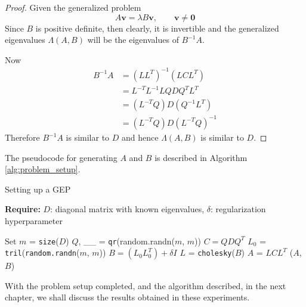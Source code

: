 \begin{proof}
	Given the generalized problem
	\begin{equation}
		A \mathbf{v} = \lambda B \mathbf{v}, \qquad \mathbf{v} \neq \mathbf{0}
	\end{equation}
	Since $B$ is positive definite, then clearly, it is invertible and the generalized eigenvalues $\Lambda(A, B)$ will be the eigenvalues of $B^{-1}A$.

	Now
	\begin{align*}
		B^{-1}A & = (LL^T)^{-1}(LCL^T)\\
		& = L^{-T}L^{-1}LQDQ^{T}L^T\\
		& = (L^{-T}Q)D(Q^{-1}L^{T}) \\
		& = (L^{-T}Q)D(L^{-T}Q)^{-1}
	\end{align*}
	Therefore $B^{-1}A$ is similar to $D$ and hence $\Lambda(A,B)$ is similar to $D$.
\end{proof}
The pseudocode for generating $A$ and $B$ is described in Algorithm \ref{alg:problem_setup}.
\begin{algorithm}
	\caption{Setting up a GEP}
	\label{alg:problem_setup}
	
	\textbf{Require:} \( D \): diagonal matrix with known eigenvalues, \(\delta\): regularization hyperparameter
	\begin{algorithmic}[1]
		\State Set $m$ = \texttt{size}($D$)
		\State $Q$, \_\_ = \texttt{qr}(random.randn($m$, $m$))
		\State $C = QDQ^T$
		\State $L_{0}$ = \texttt{tril}(\texttt{random.randn}($m$, $m$))
		\State $B = (L_0 L_0^T) + \delta I$
		\State $L$ = \texttt{cholesky}($B$)
		\State $A$ = $LCL^T$
		\State \Return ($A$, $B$)
		\EndFunction
	\end{algorithmic}
\end{algorithm}
With the problem setup completed, and the algorithm described, in the next chapter, we shall discuss the results obtained in these experiments.


